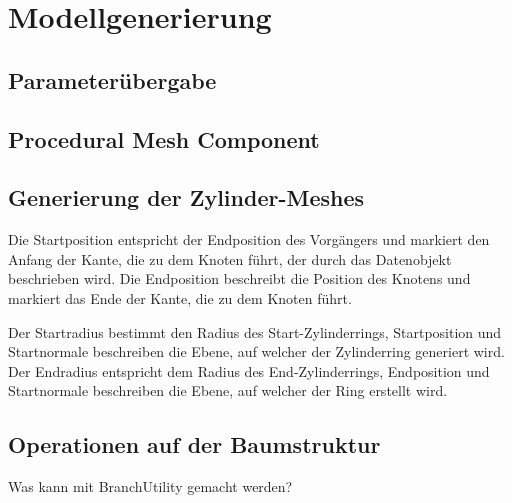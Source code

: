 \section{Modellgenerierung} \label{sec:Modellgenerierung}

\subsection{Parameterübergabe}

\subsection{Procedural Mesh Component}

\subsection{Generierung der Zylinder-Meshes} \label{subsec:ZylinderMeshes}

Die Startposition entspricht der Endposition des Vorgängers und markiert den Anfang der Kante, die zu dem Knoten führt, der durch das Datenobjekt beschrieben wird. Die Endposition beschreibt die Position des Knotens und markiert das Ende der Kante, die zu dem Knoten führt. 

Der Startradius bestimmt den Radius des Start-Zylinderrings, Startposition und Startnormale beschreiben die Ebene, auf welcher der Zylinderring generiert wird. Der Endradius entspricht dem Radius des End-Zylinderrings, Endposition und Startnormale beschreiben die Ebene, auf welcher der Ring erstellt wird.

\subsection{Operationen auf der Baumstruktur}

Was kann mit BranchUtility gemacht werden?
